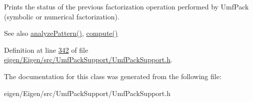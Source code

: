 Prints the status of the previous factorization operation performed by Umf\+Pack (symbolic or numerical factorization).

\begin{DoxySeeAlso}{See also}
\hyperlink{class_eigen_1_1_umf_pack_l_u_ac7ea28b2017d6b26b7b08497f294e5e6}{analyze\+Pattern()}, \hyperlink{class_eigen_1_1_umf_pack_l_u_a05fb2b5717ebd67e46b83439721ceee7}{compute()} 
\end{DoxySeeAlso}


Definition at line \hyperlink{eigen_2_eigen_2src_2_umf_pack_support_2_umf_pack_support_8h_source_l00342}{342} of file \hyperlink{eigen_2_eigen_2src_2_umf_pack_support_2_umf_pack_support_8h_source}{eigen/\+Eigen/src/\+Umf\+Pack\+Support/\+Umf\+Pack\+Support.\+h}.



The documentation for this class was generated from the following file\+:\begin{DoxyCompactItemize}
\item 
eigen/\+Eigen/src/\+Umf\+Pack\+Support/\+Umf\+Pack\+Support.\+h\end{DoxyCompactItemize}
